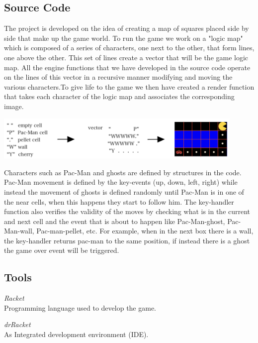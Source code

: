 \documentclass{article}
\begin{document}
 \subsection{Source Code}
 The project is developed on the idea of creating a map of squares placed side by side that make up the game world. To run the game we work on a "logic map" which is composed of a series of characters, one next to the other, that form lines, one above the other. This set of lines create a vector that will be the game logic map. All the engine functions that we have developed in the source code operate on the lines of this vector in a recursive manner modifying and moving the various characters.To give life to the game we then have created a render function that takes each character of the logic map and associates the corresponding image.\\
 
 \begin{center}
 \includegraphics[width=12cm]{./images/vector.jpeg}
 \end{center}

 Characters such as Pac-Man and ghosts are defined by structures in the code. Pac-Man movement is defined by the key-events (up, down, left, right) while instead the movement of ghosts is defined randomly until Pac-Man is in one of the near cells, when this happens they start to follow him. The key-handler function also verifies the validity of the moves by checking what is in the current and next cell and the event that is about to happen like Pac-Man-ghost, Pac-Man-wall, Pac-man-pellet, etc. For example, when in the next box there is a wall, the key-handler returns pac-man to the same position, if instead there is a ghost the game over event will be triggered. 
 
 \subsection{Tools}
 
 \hspace{0.5cm}\textit{Racket}\\
 Programming language used to develop the game.

 \textit{drRacket}\\
 As Integrated development environment (IDE).
 
\end{document}
